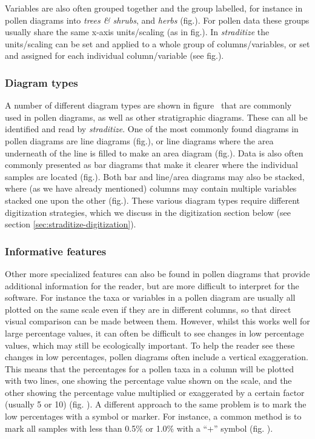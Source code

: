 \begin{refsection}
Variables are also often grouped together and the group labelled, for instance in pollen diagrams into \emph{trees \& shrubs}, and \emph{herbs} (fig.\samplediagram[d]). For pollen data these groups usually share the same x-axis units/scaling (as in fig.\samplediagram[b]). In \emph{straditize} the units/scaling can be set and applied to a whole group of columns/variables, or set and assigned for each individual column/variable (see fig.\samplediagram[e]).

\subsubsection{Diagram types}  \label{sec:straditize-types}
A number of different diagram types are shown in figure \samplediagram\, that are commonly used in pollen diagrams, as well as other stratigraphic diagrams. These can all be identified and read by \emph{straditize}. One of the most commonly found diagrams in pollen diagrams are line diagrams (fig.\samplediagram[f]), or line diagrams where the area underneath of the line is filled to make an area diagram (fig.\samplediagram[h]). Data is also often commonly presented as bar diagrams that make it clearer where the individual samples are located (fig.\samplediagram[g]). Both bar and line/area diagrams may also be stacked, where (as we have already mentioned) columns may contain multiple variables stacked one upon the other (fig.\samplediagram[i]). These various diagram types require different digitization strategies, which we discuss in the digitization section below (see section \ref{sec:straditize-digitization}).

\subsubsection{Informative features}  \label{sec:straditize-features}
Other more specialized features can also be found in pollen diagrams that provide additional information for the reader, but are more difficult to interpret for the software. For instance the taxa or variables in a pollen diagram are usually all plotted on the same scale even if they are in different columns, so that direct visual comparison can be made between them. However, whilst this works well for large percentage values, it can often be difficult to see changes in low percentage values, which may still be ecologically important. To help the reader see these changes in low percentages, pollen diagrams often include a vertical exaggeration. This means that the percentages for a pollen taxa in a column will be plotted with two lines, one showing the percentage value shown on the scale, and the other showing the percentage value multiplied or exaggerated by a certain factor (usually 5 or 10) (fig. \samplediagram[j]). A different approach to the same problem is to mark the low percentages with a symbol or marker. For instance, a common method is to mark all samples with less than 0.5\% or 1.0\% with a \enquote{+} symbol (fig. \samplediagram[k]).


\end{refsection}
